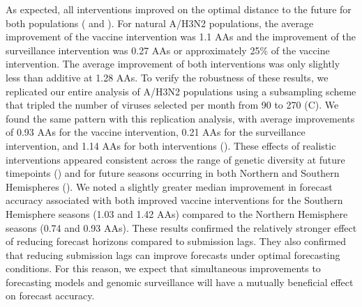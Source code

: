 \documentclass[9pt,lineno]{elife}
\begin{document}
As expected, all interventions improved on the optimal distance to the future for both populations ( and ).
For natural A/H3N2 populations, the average improvement of the vaccine intervention was 1.1 AAs and the improvement of the surveillance intervention was 0.27 AAs or approximately 25\% of the vaccine intervention.
The average improvement of both interventions was only slightly less than additive at 1.28 AAs.
To verify the robustness of these results, we replicated our entire analysis of A/H3N2 populations using a subsampling scheme that tripled the number of viruses selected per month from 90 to 270 (C).
We found the same pattern with this replication analysis, with average improvements of 0.93 AAs for the vaccine intervention, 0.21 AAs for the surveillance intervention, and 1.14 AAs for both interventions ().
These effects of realistic interventions appeared consistent across the range of genetic diversity at future timepoints () and for future seasons occurring in both Northern and Southern Hemispheres ().
We noted a slightly greater median improvement in forecast accuracy associated with both improved vaccine interventions for the Southern Hemisphere seasons (1.03 and 1.42 AAs) compared to the Northern Hemisphere seasons (0.74 and 0.93 AAs).
These results confirmed the relatively stronger effect of reducing forecast horizons compared to submission lags.
They also confirmed that reducing submission lags can improve forecasts under optimal forecasting conditions.
For this reason, we expect that simultaneous improvements to forecasting models and genomic surveillance will have a mutually beneficial effect on forecast accuracy.
\end{document}
